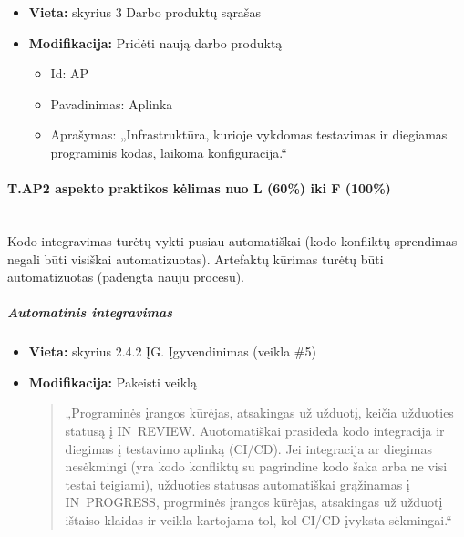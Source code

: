 \documentclass{article}
\newcommand{\subsubsubsection}[1]{\paragraph{#1}\mbox{}\\}
\begin{document}
\vspace{10pt}
\begin{itemize}
    \item \textbf{Vieta:} skyrius 3 Darbo produktų sąrašas
    \item \textbf{Modifikacija:} Pridėti naują darbo produktą
    \begin{itemize}
        \item Id: AP
        \item Pavadinimas: Aplinka
        \item Aprašymas: „Infrastruktūra, kurioje vykdomas testavimas ir diegiamas programinis kodas, laikoma konfigūracija.“
    \end{itemize}
\end{itemize}

\subsubsubsection{T.AP2 aspekto praktikos kėlimas nuo L (60\%) iki F (100\%)}

Kodo integravimas turėtų vykti pusiau automatiškai (kodo konfliktų sprendimas negali būti visiškai automatizuotas). Artefaktų kūrimas turėtų būti automatizuotas (padengta nauju procesu).

\subparagraph{Automatinis integravimas}
\begin{itemize}
    \item \textbf{Vieta:} skyrius 2.4.2 ĮG. Įgyvendinimas (veikla \#5)
    \item \textbf{Modifikacija:} Pakeisti veiklą
    \begin{quote}
    „Programinės įrangos kūrėjas, atsakingas už užduotį, keičia užduoties statusą į \mbox{IN~REVIEW}. Auotomatiškai prasideda kodo integracija ir diegimas į testavimo aplinką (CI/CD). Jei integracija ar diegimas nesėkmingi (yra kodo konfliktų su pagrindine kodo šaka arba ne visi testai teigiami), užduoties statusas automatiškai grąžinamas į \mbox{IN~PROGRESS}, progrminės įrangos kūrėjas, atsakingas už užduotį ištaiso klaidas ir veikla kartojama tol, kol CI/CD įvyksta sėkmingai.“
    \end{quote}
\end{itemize}
\vspace{10pt}
\end{document}
